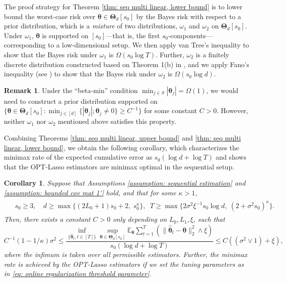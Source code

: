 \documentclass[aos,preprint]{imsart}
\theoremstyle{plain}
\newtheorem{corollary}[theorem]{Corollary}
\theoremstyle{definition}
\newtheorem{remark}{Remark}
\newcommand{\bTheta}{\boldsymbol{\Theta}}
\newcommand{\btheta}{\boldsymbol{\theta}}
\newcommand{\hbtheta}{\widehat{\boldsymbol{\theta}}}
\newcommand{\Exp}{\mathbb{E}}
\begin{document}
The proof strategy for Theorem \ref{thm: seq multi linear, lower bound} is to lower bound the worst-case risk over $\btheta \in \bTheta_d[s_0]$ by the Bayes risk with respect to a prior distribution, which is a \textit{mixture} of two distributions, $\omega_1$ and $\omega_2$ on $\bTheta_d[s_0]$. Under $\omega_1$, $\btheta$ is supported on $[s_0]$---that is, the first $s_0$-components---corresponding to a low-dimensional setup. We then apply van Tree's inequality \citep{gill1995applications} to show that the Bayes risk under $\omega_1$ is $\Omega(s_0\log T)$. Further, $\omega_2$ is a finitely discrete distribution constructed based on Theorem 1(b) in \cite{raskutti2011minimax}, and we apply Fano's inequality (see \cite[Theorem 4.10]{rigollet2023highdimensionalstatistics}) to show that the Bayes risk under $\omega_2$ is $\Omega(s_0\log d)$.


\begin{remark} \label{remark:beta_min_lower_bound_diff}
Under the ``beta-min'' condition  $\min_{j \in S} |\btheta_j| = \Omega(1)$, we would need to construct a prior distribution supported on $\{\btheta \in \bTheta_d[s_0]: \min_{j \in [d]}\{|\btheta_j|; \btheta_j \neq 0\} \geq C^{-1}\}$ for some constant $C > 0$. However, neither $\omega_1$ nor $\omega_2$ mentioned above satisfies this property.
\end{remark}
 
Combining Theorems \ref{thm: seq multi linear, upper bound} and \ref{thm: seq multi linear, lower bound}, we obtain the following corollary, which characterizes the minimax rate of the expected cumulative error as $s_0(\log d + \log T)$ and shows that the OPT-Lasso estimators are minimax optimal in the sequential setup.

\begin{corollary} \label{cor: seq multi linear}
Suppose that Assumptions \ref{assumption: sequential estimation} and \ref{assumption: bounded cov mat 1'} hold, and that for some $\kappa > 1$,
\begin{align*}
    \begin{split}
    &s_0 \geq 3, \quad d \ge \max\{(2L_0+1)s_0 + 2,\; s_0^{\kappa}\}, \;\;
    T\ge \max\{2\sigma^2 \xi^{-1}s_0\log d,\; (2+\sigma^2 s_0)^{\kappa}\}.
        \end{split}
\end{align*}
Then, there exists a constant $C>0$ only depending on $L_0,L_1, \xi$, such that 
$$C^{-1}(1-1/\kappa)\sigma^2 \le \frac{\inf_{\{\hbtheta_t, t\in [T]\}}\sup_{\btheta\in \bTheta_d[s_0]} \Exp_{\btheta}\sum_{t=1}^{T} (\|\hbtheta_t-\btheta\|_2^2\wedge \xi)} {s_0(\log d + \log T)} \le C((\sigma^2 \vee 1) + \xi),$$
where the infimum is taken over all permissible estimators. Further, the minimax rate is achieved by the OPT-Lasso estimators if we set the tuning parameters as in \eqref{eq: online regularization threshold parameter}.
\end{corollary}
\end{document}
